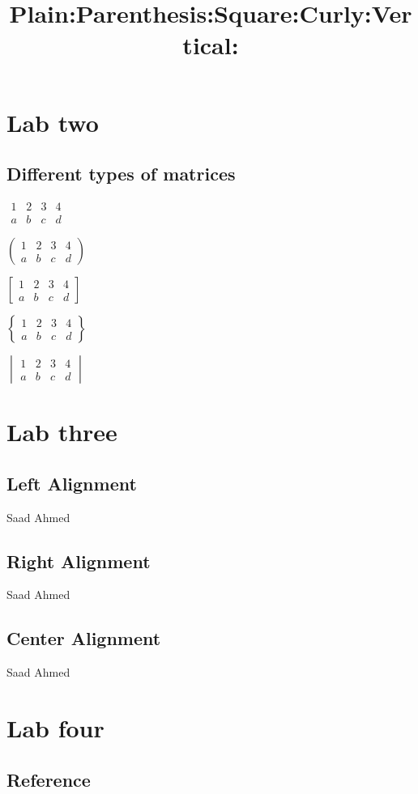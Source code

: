 \documentclass{article}
\begin{document}
\section{Lab two}
\subsection{Different types of matrices}
\begin{center}
\title{Plain:}
$\begin{matrix}
1 & 2 & 3 & 4 \\
a & b & c & d
\end{matrix}$
\linebreak
\title{Parenthesis:}
$\begin{pmatrix}
1 & 2 & 3 & 4 \\
a & b & c & d
\end{pmatrix}$
\linebreak
\title{Square:}
$\begin{bmatrix}
1 & 2 & 3 & 4 \\
a & b & c & d
\end{bmatrix}$
\linebreak
\title{Curly:}
$\begin{Bmatrix}
1 & 2 & 3 & 4 \\
a & b & c & d
\end{Bmatrix}$
\linebreak
\title{Vertical:}
$\begin{vmatrix}
1 & 2 & 3 & 4 \\
a & b & c & d
\end{vmatrix}$
\linebreak
\end{center}
\newpage

\section{Lab three}
\subsection{Left Alignment}
\begin{FlushLeft}
Saad Ahmed
\end{FlushLeft}
\subsection{Right Alignment}
\begin{FlushRight}
Saad Ahmed
\end{FlushRight}
\subsection{Center Alignment}
\begin{Center}
Saad Ahmed
\end{Center}
\newpage

\section{Lab four}
\subsection{Reference}
\end{document}

